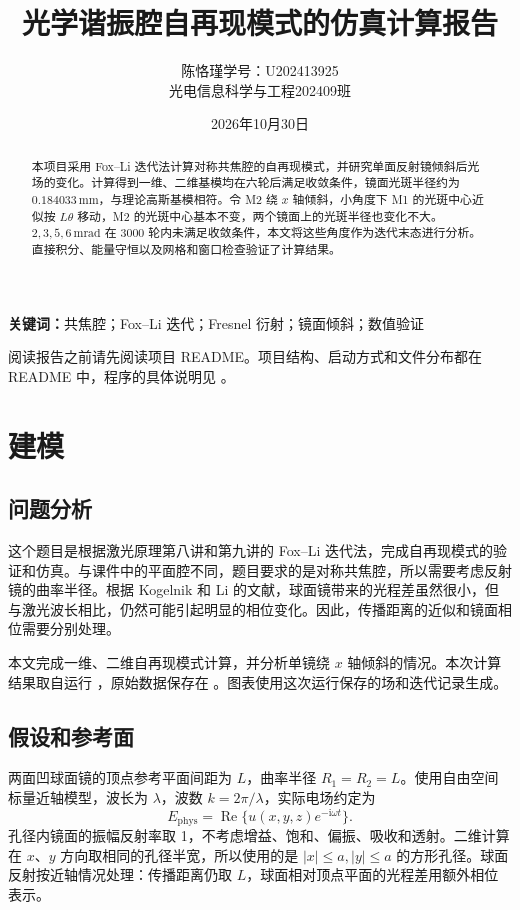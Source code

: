 \documentclass[UTF8,a4paper,11pt,fontset=fandol]{ctexart}
\title{光学谐振腔自再现模式的仿真计算报告}
\author{陈恪瑾\quad 学号：U202413925\\光电信息科学与工程202409班}
\date{2026年10月30日}
\newcommand{\ii}{\mathrm{i}}
\begin{document}
\maketitle
\begin{abstract}
本项目采用 Fox--Li 迭代法计算对称共焦腔的自再现模式，并研究单面反射镜倾斜后光场的变化。计算得到一维、二维基模均在六轮后满足收敛条件，镜面光斑半径约为 $0.184033\,\mathrm{mm}$，与理论高斯基模相符。令 M2 绕 $x$ 轴倾斜，小角度下 M1 的光斑中心近似按 $L\theta$ 移动，M2 的光斑中心基本不变，两个镜面上的光斑半径也变化不大。$2,3,5,6\,\mathrm{mrad}$ 在 3000 轮内未满足收敛条件，本文将这些角度作为迭代末态进行分析。直接积分、能量守恒以及网格和窗口检查验证了计算结果。
\end{abstract}
\noindent\textbf{关键词：}共焦腔；Fox--Li 迭代；Fresnel 衍射；镜面倾斜；数值验证
\tableofcontents
\clearpage

\noindent 阅读报告之前请先阅读项目 README。项目结构、启动方式和文件分布都在 README 中，程序的具体说明见 。

\section{建模}
\subsection{问题分析}
这个题目是根据激光原理第八讲和第九讲的 Fox--Li 迭代法，完成自再现模式的验证和仿真。与课件中的平面腔不同，题目要求的是对称共焦腔，所以需要考虑反射镜的曲率半径。根据 Kogelnik 和 Li 的文献\cite{kogelnik}，球面镜带来的光程差虽然很小，但与激光波长相比，仍然可能引起明显的相位变化。因此，传播距离的近似和镜面相位需要分别处理。

本文完成一维、二维自再现模式计算，并分析单镜绕 $x$ 轴倾斜的情况。本次计算结果取自运行 \RunID，原始数据保存在 \RunPath。图表使用这次运行保存的场和迭代记录生成。

\subsection{假设和参考面}
两面凹球面镜的顶点参考平面间距为 $L$，曲率半径 $R_1=R_2=L$。使用自由空间标量近轴模型，波长为 $\lambda$，波数 $k=2\pi/\lambda$，实际电场约定为
\begin{equation}
 E_{\mathrm{phys}}=\operatorname{Re}\{u(x,y,z)e^{-\ii\omega t}\}.
\end{equation}
孔径内镜面的振幅反射率取 1，不考虑增益、饱和、偏振、吸收和透射。二维计算在 $x$、$y$ 方向取相同的孔径半宽，所以使用的是 $|x|\le a,|y|\le a$ 的方形孔径。球面反射按近轴情况处理：传播距离仍取 $L$，球面相对顶点平面的光程差用额外相位表示。
\end{document}

